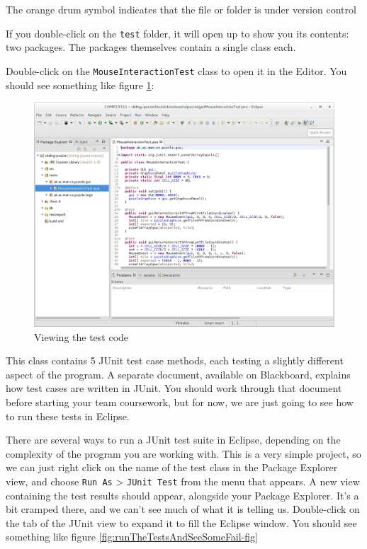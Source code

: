 \documentclass[
]{book}
\begin{document}
The orange drum symbol indicates that the file or folder is under version control

If you double-click on the \texttt{test} folder, it will open up to show you its contents: two packages. The packages themselves contain a single class each.

Double-click on the \texttt{MouseInteractionTest} class to open it in the Editor. You should see something like figure \ref{fig:viewingtheTestCode-fig}:

\begin{figure}

{\centering \includegraphics[width=1\linewidth]{images/viewingtheTestCode} 

}

\caption{Viewing the test code}\label{fig:viewingtheTestCode-fig}
\end{figure}

This class contains 5 JUnit test case methods, each testing a slightly different aspect of the program. A separate document, available on Blackboard, explains how test cases are written in JUnit. You should work through that document before starting your team coursework, but for now, we are just going to see how to run these tests in Eclipse.

There are several ways to run a JUnit test suite in Eclipse, depending on the complexity of the program you are working with. This is a very simple project, so we can just right click on the name of the test class in the Package Explorer view, and choose \texttt{Run\ As} \textgreater{} \texttt{JUnit\ Test} from the menu that appears. A new view containing the test results should appear, alongside your Package Explorer. It's a bit cramped there, and we can't see much of what it is telling us. Double-click on the tab of the JUnit view to expand it to fill the Eclipse window. You should see something like figure \ref{fig:runTheTestsAndSeeSomeFail-fig}
\end{document}
